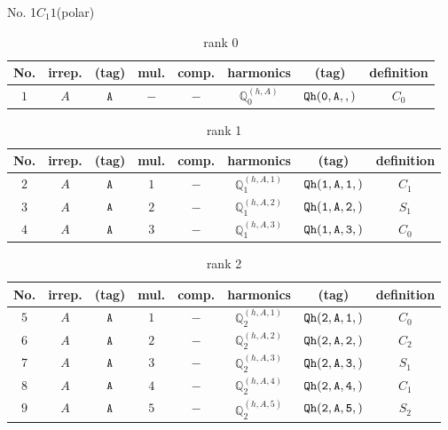 \documentclass[fleqn,8pt]{jsarticle}
\begin{document}
\setcounter{MaxMatrixCols}{16}

\begin{center}
\LARGE
No. 1\quad$C_{1}$\quad$1$\quad[ triclinic ] (polar)
\end{center}
\begin{table}[ht!]
\begin{center}
\caption{rank 0}
\renewcommand{\arraystretch}{1.3}
\begin{tabular}{cccccccc} \hline \hline
No. & irrep. & (tag) & mul. & comp. & harmonics & (tag) & definition \\ \hline
$ 1 $ & $ A $ & $ {\tt A} $ & $ - $ & $ - $ & $ \mathbb{Q}_{0}^{(h,A)} $ & $ {\tt Qh(0,A,,)} $ & $ C_{0} $ \\
 \hline \hline
\end{tabular}
\end{center}
\end{table}
\begin{table}[ht!]
\begin{center}
\caption{rank 1}
\renewcommand{\arraystretch}{1.3}
\begin{tabular}{cccccccc} \hline \hline
No. & irrep. & (tag) & mul. & comp. & harmonics & (tag) & definition \\ \hline
$ 2 $ & $ A $ & $ {\tt A} $ & $ 1 $ & $ - $ & $ \mathbb{Q}_{1}^{(h,A,1)} $ & $ {\tt Qh(1,A,1,)} $ & $ C_{1} $ \\
$ 3 $ & $ A $ & $ {\tt A} $ & $ 2 $ & $ - $ & $ \mathbb{Q}_{1}^{(h,A,2)} $ & $ {\tt Qh(1,A,2,)} $ & $ S_{1} $ \\
$ 4 $ & $ A $ & $ {\tt A} $ & $ 3 $ & $ - $ & $ \mathbb{Q}_{1}^{(h,A,3)} $ & $ {\tt Qh(1,A,3,)} $ & $ C_{0} $ \\
 \hline \hline
\end{tabular}
\end{center}
\end{table}
\begin{table}[ht!]
\begin{center}
\caption{rank 2}
\renewcommand{\arraystretch}{1.3}
\begin{tabular}{cccccccc} \hline \hline
No. & irrep. & (tag) & mul. & comp. & harmonics & (tag) & definition \\ \hline
$ 5 $ & $ A $ & $ {\tt A} $ & $ 1 $ & $ - $ & $ \mathbb{Q}_{2}^{(h,A,1)} $ & $ {\tt Qh(2,A,1,)} $ & $ C_{0} $ \\
$ 6 $ & $ A $ & $ {\tt A} $ & $ 2 $ & $ - $ & $ \mathbb{Q}_{2}^{(h,A,2)} $ & $ {\tt Qh(2,A,2,)} $ & $ C_{2} $ \\
$ 7 $ & $ A $ & $ {\tt A} $ & $ 3 $ & $ - $ & $ \mathbb{Q}_{2}^{(h,A,3)} $ & $ {\tt Qh(2,A,3,)} $ & $ S_{1} $ \\
$ 8 $ & $ A $ & $ {\tt A} $ & $ 4 $ & $ - $ & $ \mathbb{Q}_{2}^{(h,A,4)} $ & $ {\tt Qh(2,A,4,)} $ & $ C_{1} $ \\
$ 9 $ & $ A $ & $ {\tt A} $ & $ 5 $ & $ - $ & $ \mathbb{Q}_{2}^{(h,A,5)} $ & $ {\tt Qh(2,A,5,)} $ & $ S_{2} $ \\
 \hline \hline
\end{tabular}
\end{center}
\end{table}
\end{document}
